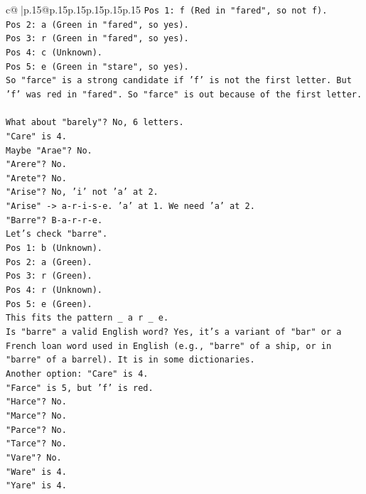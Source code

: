 \documentclass{article}
\begin{document}
{\begin{supertabular}{c@{$\;$}|p{.15\linewidth}@{}p{.15\linewidth}p{.15\linewidth}p{.15\linewidth}p{.15\linewidth}p{.15\linewidth}}
{{{\texttt{Pos 1: f (Red in "fared", so not f).} \\
\texttt{Pos 2: a (Green in "fared", so yes).} \\
\texttt{Pos 3: r (Green in "fared", so yes).} \\
\texttt{Pos 4: c (Unknown).} \\
\texttt{Pos 5: e (Green in "stare", so yes).} \\
\texttt{So "farce" is a strong candidate if 'f' is not the first letter. But 'f' was red in "fared". So "farce" is out because of the first letter.} \\
\\ 
\texttt{What about "barely"? No, 6 letters.} \\
\texttt{"Care" is 4.} \\
\texttt{Maybe "Arae"? No.} \\
\texttt{"Arere"? No.} \\
\texttt{"Arete"? No.} \\
\texttt{"Arise"? No, 'i' not 'a' at 2.} \\
\texttt{"Arise" {-}> a{-}r{-}i{-}s{-}e. 'a' at 1. We need 'a' at 2.} \\
\texttt{"Barre"? B{-}a{-}r{-}r{-}e.} \\
\texttt{Let's check "barre".} \\
\texttt{Pos 1: b (Unknown).} \\
\texttt{Pos 2: a (Green).} \\
\texttt{Pos 3: r (Green).} \\
\texttt{Pos 4: r (Unknown).} \\
\texttt{Pos 5: e (Green).} \\
\texttt{This fits the pattern \_ a r \_ e.} \\
\texttt{Is "barre" a valid English word? Yes, it's a variant of "bar" or a French loan word used in English (e.g., "barre" of a ship, or in "barre" of a barrel). It is in some dictionaries.} \\
\texttt{Another option: "Care" is 4.} \\
\texttt{"Farce" is 5, but 'f' is red.} \\
\texttt{"Harce"? No.} \\
\texttt{"Marce"? No.} \\
\texttt{"Parce"? No.} \\
\texttt{"Tarce"? No.} \\
\texttt{"Vare"? No.} \\
\texttt{"Ware" is 4.} \\
\texttt{"Yare" is 4.} \\
}}}
\end{supertabular}}
\end{document}
